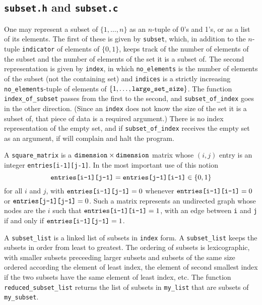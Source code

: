 \documentclass[12pt]{article}
\theoremstyle{definition}
\begin{document}
\begin{appendix}
\subsection{\texttt{subset.h} and \texttt{subset.c}}

One may represent a subset of $\{1, \ldots, n\}$ as an $n$-tuple of
0's and 1's, or as a list of its elements.  The first of these is
given by \texttt{subset}, which, in addition to the $n$-tuple
\texttt{indicator} of elements of $\{0,1\}$, keeps track of the number
of elements of the subset and the number of elements of the set it is
a subset of.  The second representation is given by \texttt{index}, in
which \texttt{no\_elements} is the number of elements of the subset
(not the containing set) and \texttt{indices} is a strictly increasing
\texttt{no\_elements}-tuple of elements of $\{1, \ldots,
\text{\texttt{large\_set\_size}}\}$.  The function
\texttt{index\_of\_subset} passes from the first to the second, and
\texttt{subset\_of\_index} goes in the other direction.  (Since an
\texttt{index} does not know the size of the set it is a subset of,
that piece of data is a required argument.) There is no index
representation of the empty set, and if \texttt{subset\_of\_index}
receives the empty set as an argument, if will complain and halt the
program.

A \texttt{square\_matrix} is a $\text{\texttt{dimension}} \times
\texttt{dimension}$ matrix whose $(i,j)$ entry is an integer
\texttt{entries[i-1][j-1]}.  In the most important use of this notion
$$\text{\texttt{entries[i-1][j-1]}} =
\text{\texttt{entries[j-1][i-1]}} \in \{0,1\}$$ for all $i$ and $j$,
with $\text{\texttt{entries[i-1][j-1]}} = 0$ whenever
$\text{\texttt{entries[i-1][i-1]}} = 0$ or
$\text{\texttt{entries[j-1][j-1]}} = 0$.  Such a matrix represents an
undirected graph whose nodes are the $i$ such that
$\text{\texttt{entries[i-1][i-1]}} = 1$, with an edge between
\texttt{i} and \texttt{j} if and only if
$\text{\texttt{entries[i-1][j-1]}} = 1$.

A \texttt{subset\_list} is a linked list of subsets in \texttt{index}
form.  A \texttt{subset\_list} keeps the subsets in order from least
to greatest.  The ordering of subsets is lexicographic, with smaller
subsets preceeding larger subsets and subsets of the same size ordered
according the element of least index, the element of second smallest
index if the two subsets have the same element of least index, etc.
The function \texttt{reduced\_subset\_list} returns the list of
subsets in \texttt{my\_list} that are subsets of \texttt{my\_subset}.


\end{appendix}
\end{document}
